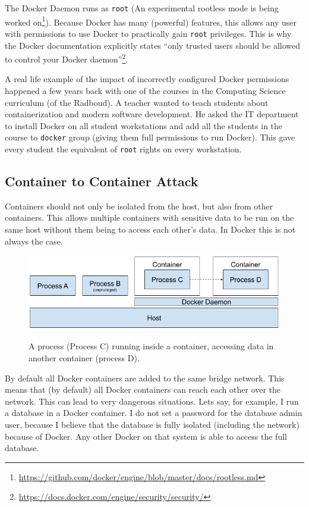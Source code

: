 \hfill

The Docker Daemon runs as \lstinline{root} (An experimental rootless mode is being worked on\footnote{\url{https://github.com/docker/engine/blob/master/docs/rootless.md}}). Because Docker has many (powerful) features, this allows any user with permissions to use Docker to practically gain \lstinline{root} privileges. This is why the Docker documentation explicitly states ``only trusted users should be allowed to control your Docker daemon''\footnote{\url{https://docs.docker.com/engine/security/security/}}.

\hfill

A real life example of the impact of incorrectly configured Docker permissions happened a few years back with one of the courses in the Computing Science curriculum (of the Radboud). A teacher wanted to teach students about containerization and modern software development. He asked the IT department to install Docker on all student workstations and add all the students in the course to \lstinline{docker} group (giving them full permissions to run Docker). This gave every student the equivalent of \lstinline{root} rights on every workstation.

\subsection{Container to Container Attack}
Containers should not only be isolated from the host, but also from other containers. This allows multiple containers with sensitive data to be run on the same host without them being to access each other's data. In Docker this is not always the case.

\begin{figure}[ht]
    \centering
    \includegraphics[width=.9\linewidth]{resources/images/attack-scenario-4.png}
    \caption{}\label{fig:container-to-container-attack}
    \medskip
    \small
    A process (Process C) running inside a container, accessing data in another container (process D).
\end{figure}

By default all Docker containers are added to the same bridge network. This means that (by default) all Docker containers can reach each other over the network. This can lead to very dangerous situations. Lets say, for example, I run a database in a Docker container. I do not set a password for the database admin user, because I believe that the database is fully isolated (including the network) because of Docker. Any other Docker on that system is able to access the full database.


